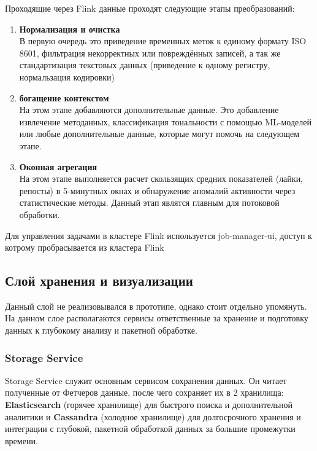             Проходящие через Flink данные проходят следующие этапы преобразований:
            \begin{enumerate}
                \item \textbf{Нормализация и очистка} \\
                В первую очередь это приведение временных меток к единому формату ISO 8601, фильтрация некорректных или повреждённых записей, а так же стандартизация текстовых данных (приведение к одному регистру, нормальзация кодировки)
                \item \textbf{богащение контекстом} \\
                На этом этапе добавляются дополнительные данные. Это добавление извлечение методанных, классификация тональности с помощью ML-моделей или любые дополнительные данные, которые могут помочь на следующем этапе.
                \item \textbf{Оконная агрегация} \\
                На этом этапе выполняется расчет скользящих средних показателей (лайки, репосты) в 5-минутных окнах и обнаружение аномалий активности через статистические методы. Данный этап являтся главным для потоковой обработки.
            \end{enumerate}

            Для управления задачами в кластере Flink используется job-manager-ui, доступ к котрому пробрасывается из кластера Flink

    \subsection{Слой хранения и визуализации}
        Данный слой не реализовывался в прототипе, однако стоит отдельно упомянуть. На данном слое располагаются сервисы ответственные за хранение и подготовку данных к глубокому анализу и пакетной обработке.

        \subsubsection{Storage Service}
            Storage Service служит основным сервисом сохранения данных. Он читает полученные от Фетчеров данные, после чего сохраняет их в 2 хранилища: \textbf{Elasticsearch} (горячее хранилище) для быстрого поиска и дополнительной аналитики и \textbf{Cassandra} (холодное хранилище) для долгосрочного хранения и интеграции с глубокой, пакетной обработкой данных за большие промежутки времени. 

